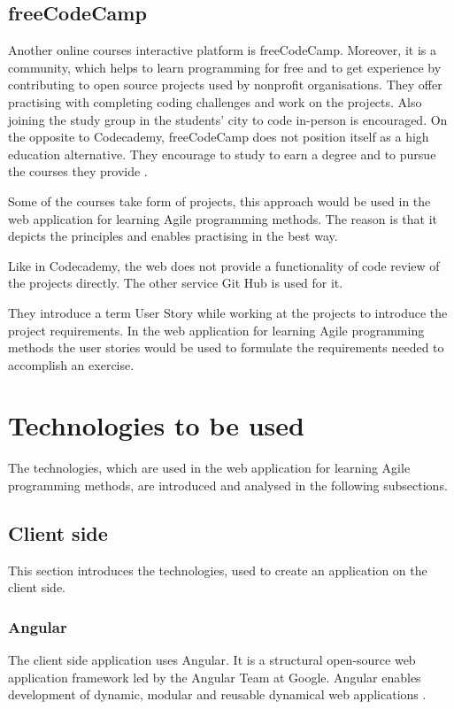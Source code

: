 \subsection{freeCodeCamp}
Another online courses interactive platform is freeCodeCamp. Moreover, it is a community, which helps to learn programming for free and to get experience by contributing to open source projects used by nonprofit organisations. They offer practising with completing coding challenges and work on the projects. Also joining the study group in the students' city to code in-person is encouraged. On the opposite to Codecademy, freeCodeCamp does not position itself as a high education alternative. They encourage to study to earn a degree and to pursue the courses they provide \cite{feecodecamp}.

Some of the courses take form of projects, this approach would be used in the web application for learning Agile programming methods. The reason is that it depicts the principles and enables practising in the best way. 

Like in Codecademy, the web does not provide a functionality of code review of the projects directly. The other service Git Hub is used for it.

They introduce a term User Story while working at the projects to introduce the project requirements. In the web application for learning Agile programming methods the user stories would be used to formulate the requirements needed to accomplish an exercise.

\section{Technologies to be used}
\label{sect:tech}
The technologies, which are used in the web application for learning Agile programming methods, are introduced and analysed in the following subsections.

\subsection{Client side}
This section introduces the technologies, used to create an application on the client side.

\subsubsection{Angular}
The client side application uses Angular. It is a structural open-source web application framework led by the Angular Team at Google. Angular enables development of dynamic, modular and reusable dynamical web applications \cite{angular_getting_started}.

